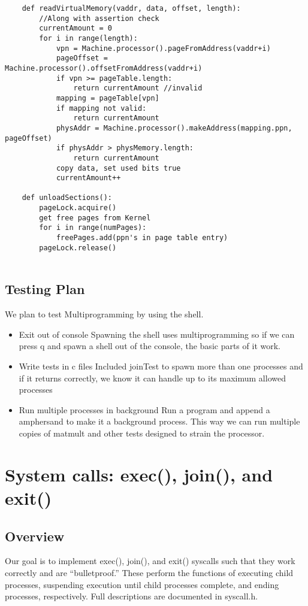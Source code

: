 \documentclass{article}
\begin{document}
\begin{verbatim}
    def readVirtualMemory(vaddr, data, offset, length):
        //Along with assertion check
        currentAmount = 0
        for i in range(length):
            vpn = Machine.processor().pageFromAddress(vaddr+i)
            pageOffset = Machine.processor().offsetFromAddress(vaddr+i)
            if vpn >= pageTable.length:
                return currentAmount //invalid
            mapping = pageTable[vpn]
            if mapping not valid:
                return currentAmount
            physAddr = Machine.processor().makeAddress(mapping.ppn, pageOffset)
            if physAddr > physMemory.length:
                return currentAmount
            copy data, set used bits true
            currentAmount++
    
    def unloadSections():
        pageLock.acquire()
        get free pages from Kernel
        for i in range(numPages):
            freePages.add(ppn's in page table entry)
        pageLock.release()
    
\end{verbatim}

\subsection{Testing Plan}
We plan to test Multiprogramming by using the shell.
\begin{itemize}
\item Exit out of console
\subitem Spawning the shell uses multiprogramming so if we can press q and spawn a shell out of the console, the basic parts of it work.
\item Write tests in c files
\subitem Included joinTest to spawn more than one processes and if it returns correctly, we know it can handle up to its maximum allowed processes
\item Run multiple processes in background
\subitem Run a program and append a amphersand to make it a background process. This way we can run multiple copies of matmult and other tests designed to strain the processor.
\end{itemize}

\section{System calls: {\ttfamily exec()}, {\ttfamily join()}, and {\ttfamily exit()}}
\subsection{Overview}
Our goal is to implement {\ttfamily exec()}, {\ttfamily join()}, and {\ttfamily exit()} syscalls such that they work correctly and are ``bulletproof.'' These perform the functions of executing child processes, suspending execution until child processes complete, and ending processes, respectively. Full descriptions are documented in {\ttfamily syscall.h}.
\end{document}
